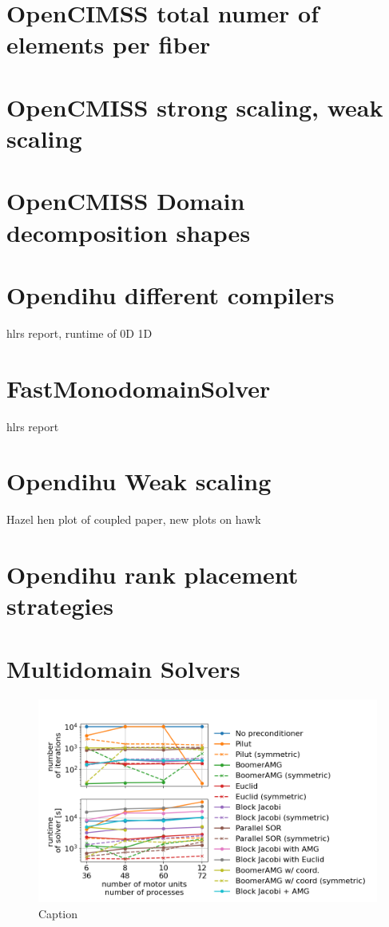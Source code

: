 \section{OpenCIMSS total numer of elements per fiber}
\section{OpenCMISS strong scaling, weak scaling}
\section{OpenCMISS Domain decomposition shapes}
\section{Opendihu different compilers}
hlrs report, runtime of 0D 1D
\section{FastMonodomainSolver}
hlrs report
\section{Opendihu Weak scaling}
Hazel hen plot of coupled paper, new plots on hawk
\section{Opendihu rank placement strategies}

\section{Multidomain Solvers}

\begin{figure}[H]%
  \centering%
  \includegraphics[width=\textwidth]{images/results/studies/multidomain_solvers_all.png}%
  \caption{Caption}%
  \label{fig:fig1}%
\end{figure}
